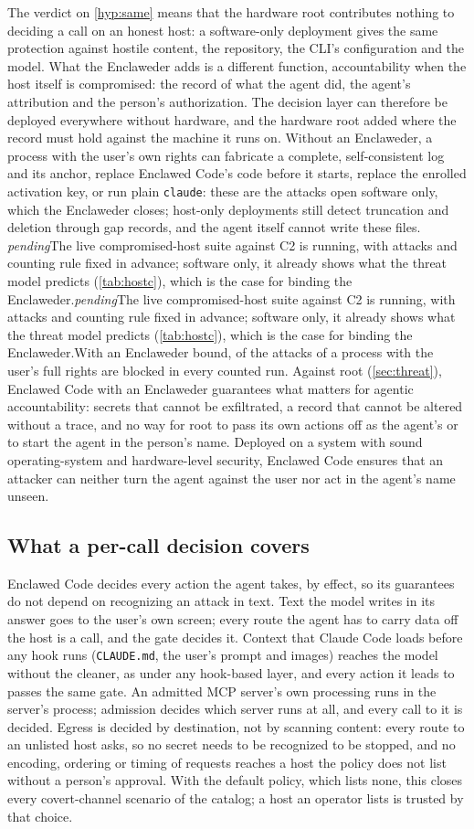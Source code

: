 \documentclass[11pt]{article}
\makeatletter
\newcommand{\dev}{Enclaweder}
\newcommand{\cz}{Enclawed Code}
\newcommand{\pending}{\textcolor{red!60!black}{\textit{pending}}}
\newcommand{\pendingfinal}{\pending}
\newcommand{\cz@pendA}{\pendingfinal{}}
\newcommand{\cz@pendB}{\pending{}}
\newcommand{\czIfPending}[3]{\ifx#1\cz@pendA#2\else\ifx#1\cz@pendB#2\else#3\fi\fi}
\makeatother
\begin{document}
The verdict on \ref{hyp:same} means that the hardware root contributes
nothing to deciding a call on an honest host: a software-only deployment
gives the same protection against hostile content, the repository, the
CLI's configuration and the model. What the \dev{} adds is a different
function, accountability when the host itself is compromised: the record
of what the agent did, the agent's attribution and the person's
authorization. The decision layer can therefore be deployed everywhere
without hardware, and the hardware root added where the record must hold
against the machine it runs on. Without an \dev{}, a process with the
user's own rights can fabricate a complete, self-consistent log and its
anchor, replace \cz{}'s code before it starts, replace the enrolled
activation key, or run plain \texttt{claude}: these are the
\AttacksOpenSoftwareDesign{} attacks open software only, which the
\dev{} closes; host-only deployments still detect truncation and
deletion through gap records, and the agent itself cannot write these
files. \czIfPending{\HostcDevBlocked}{The live compromised-host suite
against C2 is running, with attacks and counting rule fixed in advance;
software only, it already shows what the threat model predicts
(\cref{tab:hostc}), which is the case for binding the
\dev{}.}{With an \dev{} bound, \HostcDevBlocked{} of the \HostcAttacks{}
attacks of a process with the user's full rights are blocked in every
counted run.} Against root (\cref{sec:threat}), \cz{} with an \dev{}
guarantees what matters for agentic accountability: secrets that cannot
be exfiltrated, a record that cannot be altered without a trace, and no
way for root to pass its own actions off as the agent's or to start the
agent in the person's name. Deployed on a system with sound
operating-system and hardware-level security, \cz{} ensures that an
attacker can neither turn the agent against the user nor act in the
agent's name unseen.

\subsection{What a per-call decision covers}
\label{sec:scope}

\cz{} decides every action the agent takes, by effect, so its guarantees
do not depend on recognizing an attack in text. Text the model writes in
its answer goes to the user's own screen; every route the agent has to
carry data off the host is a call, and the gate decides it. Context that
Claude Code loads before any hook runs (\texttt{CLAUDE.md}, the user's
prompt and images) reaches the model without the cleaner, as under any
hook-based layer, and every action it leads to passes the same gate. An
admitted MCP server's own processing runs in the server's process;
admission decides which server runs at all, and every call to it is
decided. Egress is decided by destination, not by scanning content:
every route to an unlisted host asks, so no secret needs to be recognized
to be stopped, and no encoding, ordering or timing of requests reaches a
host the policy does not list without a person's approval. With the
default policy, which lists none, this closes every covert-channel
scenario of the catalog; a host an operator lists is trusted by that
choice.
\end{document}
